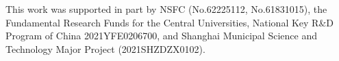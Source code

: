 \documentclass{article}
\begin{document}
This work was supported in part by NSFC (No.62225112, No.61831015), the Fundamental Research Funds for the Central Universities, National Key R\&D Program of China 2021YFE0206700, and Shanghai Municipal Science and Technology Major Project (2021SHZDZX0102).




















































































































\end{document}
